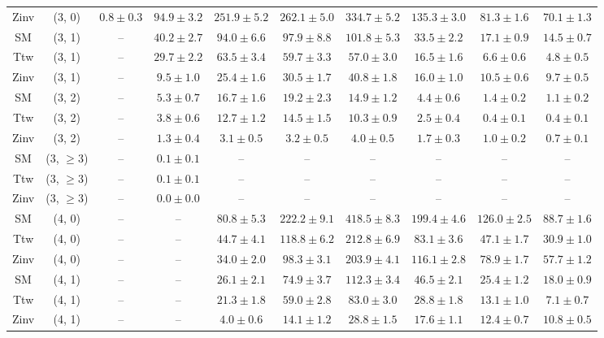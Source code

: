\begin{table}[h!]
{\begin{tabular}{cccccccccc}
	Zinv & (3, 0) & $0.8\pm 0.3$ & $94.9\pm 3.2$ & $251.9\pm 5.2$ & $262.1\pm 5.0$ & $334.7\pm 5.2$ & $135.3\pm 3.0$ & $81.3\pm 1.6$ & $70.1\pm 1.3$ \\[0.5ex] 
	SM & (3, 1) & -- & $40.2\pm 2.7$ & $94.0\pm 6.6$ & $97.9\pm 8.8$ & $101.8\pm 5.3$ & $33.5\pm 2.2$ & $17.1\pm 0.9$ & $14.5\pm 0.7$ \\[0.5ex] 
	Ttw & (3, 1) & -- & $29.7\pm 2.2$ & $63.5\pm 3.4$ & $59.7\pm 3.3$ & $57.0\pm 3.0$ & $16.5\pm 1.6$ & $6.6\pm 0.6$ & $4.8\pm 0.5$ \\[0.5ex] 
	Zinv & (3, 1) & -- & $9.5\pm 1.0$ & $25.4\pm 1.6$ & $30.5\pm 1.7$ & $40.8\pm 1.8$ & $16.0\pm 1.0$ & $10.5\pm 0.6$ & $9.7\pm 0.5$ \\[0.5ex] 
	SM & (3, 2) & -- & $5.3\pm 0.7$ & $16.7\pm 1.6$ & $19.2\pm 2.3$ & $14.9\pm 1.2$ & $4.4\pm 0.6$ & $1.4\pm 0.2$ & $1.1\pm 0.2$ \\[0.5ex] 
	Ttw & (3, 2) & -- & $3.8\pm 0.6$ & $12.7\pm 1.2$ & $14.5\pm 1.5$ & $10.3\pm 0.9$ & $2.5\pm 0.4$ & $0.4\pm 0.1$ & $0.4\pm 0.1$ \\[0.5ex] 
	Zinv & (3, 2) & -- & $1.3\pm 0.4$ & $3.1\pm 0.5$ & $3.2\pm 0.5$ & $4.0\pm 0.5$ & $1.7\pm 0.3$ & $1.0\pm 0.2$ & $0.7\pm 0.1$ \\[0.5ex] 
	SM & (3, $\ge3$) & -- & $0.1\pm 0.1$ & -- & -- & -- & -- & -- & -- \\[0.5ex] 
	Ttw & (3, $\ge3$) & -- & $0.1\pm 0.1$ & -- & -- & -- & -- & -- & -- \\[0.5ex] 
	Zinv & (3, $\ge3$) & -- & $0.0\pm 0.0$ & -- & -- & -- & -- & -- & -- \\[0.5ex] 
	SM & (4, 0) & -- & -- & $80.8\pm 5.3$ & $222.2\pm 9.1$ & $418.5\pm 8.3$ & $199.4\pm 4.6$ & $126.0\pm 2.5$ & $88.7\pm 1.6$ \\[0.5ex] 
	Ttw & (4, 0) & -- & -- & $44.7\pm 4.1$ & $118.8\pm 6.2$ & $212.8\pm 6.9$ & $83.1\pm 3.6$ & $47.1\pm 1.7$ & $30.9\pm 1.0$ \\[0.5ex] 
	Zinv & (4, 0) & -- & -- & $34.0\pm 2.0$ & $98.3\pm 3.1$ & $203.9\pm 4.1$ & $116.1\pm 2.8$ & $78.9\pm 1.7$ & $57.7\pm 1.2$ \\[0.5ex] 
	SM & (4, 1) & -- & -- & $26.1\pm 2.1$ & $74.9\pm 3.7$ & $112.3\pm 3.4$ & $46.5\pm 2.1$ & $25.4\pm 1.2$ & $18.0\pm 0.9$ \\[0.5ex] 
	Ttw & (4, 1) & -- & -- & $21.3\pm 1.8$ & $59.0\pm 2.8$ & $83.0\pm 3.0$ & $28.8\pm 1.8$ & $13.1\pm 1.0$ & $7.1\pm 0.7$ \\[0.5ex] 
	Zinv & (4, 1) & -- & -- & $4.0\pm 0.6$ & $14.1\pm 1.2$ & $28.8\pm 1.5$ & $17.6\pm 1.1$ & $12.4\pm 0.7$ & $10.8\pm 0.5$ \\[0.5ex] 

\end{tabular}}
\end{table}
